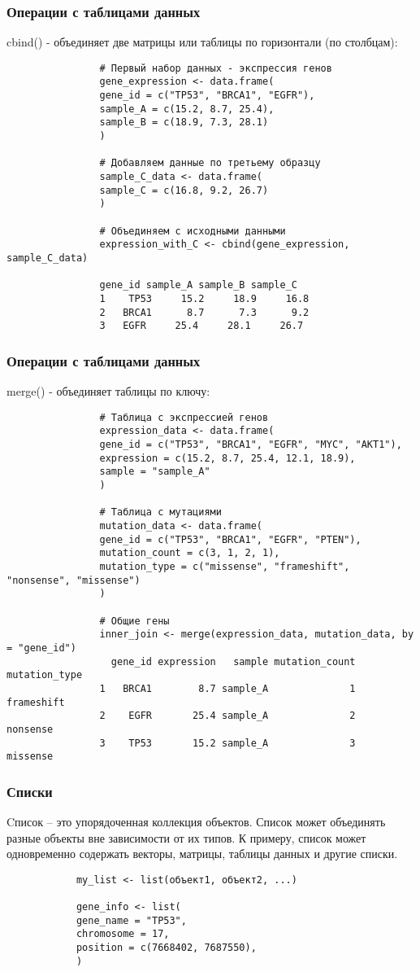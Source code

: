 \documentclass[10pt]{beamer}
\begin{document}
	
	\begin{frame}[fragile]
		\frametitle{Операции с таблицами данных}
		cbind() - объединяет две матрицы или таблицы по горизонтали (по столбцам):
		{\fontsize{7}{8}\selectfont	
			\begin{verbatim}
				# Первый набор данных - экспрессия генов
				gene_expression <- data.frame(
				gene_id = c("TP53", "BRCA1", "EGFR"),
				sample_A = c(15.2, 8.7, 25.4),
				sample_B = c(18.9, 7.3, 28.1)
				)
				
				# Добавляем данные по третьему образцу
				sample_C_data <- data.frame(
				sample_C = c(16.8, 9.2, 26.7)
				)
				
				# Объединяем с исходными данными
				expression_with_C <- cbind(gene_expression, sample_C_data)
				
				gene_id sample_A sample_B sample_C
				1    TP53     15.2     18.9     16.8
				2   BRCA1      8.7      7.3      9.2
				3   EGFR     25.4     28.1     26.7		
			\end{verbatim}
		}	
		
	\end{frame}
	
	\begin{frame}[fragile]
		\frametitle{Операции с таблицами данных}
		merge() - объединяет таблицы по ключу:
		{\fontsize{7}{8}\selectfont	
			\begin{verbatim}
				# Таблица с экспрессией генов
				expression_data <- data.frame(
				gene_id = c("TP53", "BRCA1", "EGFR", "MYC", "AKT1"),
				expression = c(15.2, 8.7, 25.4, 12.1, 18.9),
				sample = "sample_A"
				)
				
				# Таблица с мутациями
				mutation_data <- data.frame(
				gene_id = c("TP53", "BRCA1", "EGFR", "PTEN"),
				mutation_count = c(3, 1, 2, 1),
				mutation_type = c("missense", "frameshift", "nonsense", "missense")
				)
				
				# Общие гены
				inner_join <- merge(expression_data, mutation_data, by = "gene_id")
				  gene_id expression   sample mutation_count mutation_type
				1   BRCA1        8.7 sample_A              1    frameshift
				2    EGFR       25.4 sample_A              2      nonsense
				3    TP53       15.2 sample_A              3      missense	
			\end{verbatim}
		}	
		
	\end{frame}
	
	\begin{frame}[fragile]
		\frametitle{Списки}
		Cписок – это упорядоченная коллекция объектов. Список может объединять разные объекты вне зависимости от их типов. К примеру, список может одновременно содержать векторы, матрицы, таблицы данных и другие списки.
		\begin{verbatim}
			my_list <- list(объект1, объект2, ...)
			
			gene_info <- list(
			gene_name = "TP53",
			chromosome = 17,
			position = c(7668402, 7687550),
			)
		\end{verbatim}
	\end{frame}
	
\end{document}
